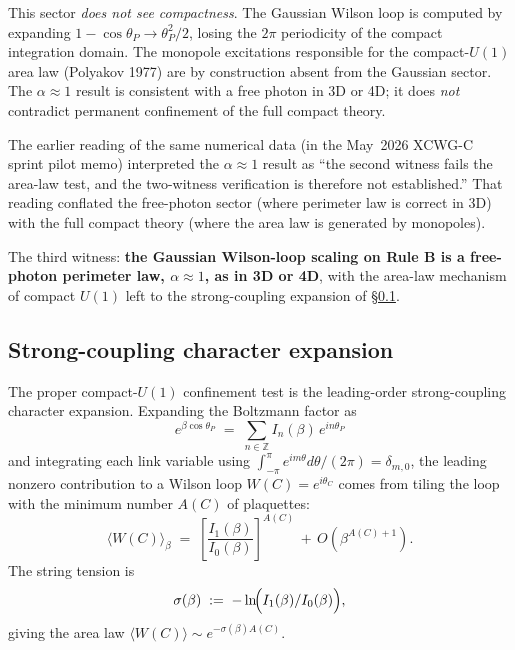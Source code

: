 \documentclass[11pt]{article}
\begin{document}
This sector \emph{does not see compactness}. The Gaussian Wilson loop is
computed by expanding $1-\cos\theta_P\to\theta_P^2/2$, losing the $2\pi$
periodicity of the compact integration domain. The monopole excitations
responsible for the compact-$U(1)$ area law (Polyakov 1977) are by construction
absent from the Gaussian sector. The $\alpha\approx 1$ result is
consistent with a free photon in 3D or 4D; it does \emph{not} contradict
permanent confinement of the full compact theory.

The earlier reading of the same numerical data (in the May~2026 XCWG-C
sprint pilot memo) interpreted the
$\alpha\approx 1$ result as ``the second witness fails the area-law test, and
the two-witness verification is therefore not established.'' That reading
conflated the free-photon sector (where perimeter law is correct in 3D) with
the full compact theory (where the area law is generated by monopoles).

The third witness: \textbf{the Gaussian Wilson-loop scaling on Rule B is a
free-photon perimeter law, $\alpha\approx 1$, as in 3D or 4D}, with the
area-law mechanism of compact $U(1)$ left to the strong-coupling expansion
of \S\ref{sec:strong_coupling}.

\subsection{Strong-coupling character expansion}
\label{sec:strong_coupling}

The proper compact-$U(1)$ confinement test is the leading-order strong-coupling
character expansion. Expanding the Boltzmann factor as
\begin{equation}
e^{\beta\cos\theta_P}\;=\;\sum_{n\in\mathbb{Z}}I_n(\beta)\,e^{in\theta_P}
\end{equation}
and integrating each link variable using
$\int_{-\pi}^{\pi}e^{im\theta}d\theta/(2\pi)=\delta_{m,0}$,
the leading nonzero contribution to a Wilson loop $W(C)=e^{i\theta_C}$ comes
from tiling the loop with the minimum number $A(C)$ of plaquettes:
\begin{equation}
\langle W(C)\rangle_\beta\;=\;\left[\frac{I_1(\beta)}{I_0(\beta)}\right]^{A(C)}
\,+\,O\!\left(\beta^{A(C)+1}\right).
\label{eq:area_law}
\end{equation}
The string tension is
\begin{equation}
\sigma(\beta)\;:=\;-\ln\!\Bigl(I_1(\beta)/I_0(\beta)\Bigr),
\end{equation}
giving the area law $\langle W(C)\rangle\sim e^{-\sigma(\beta)A(C)}$.
\end{document}
